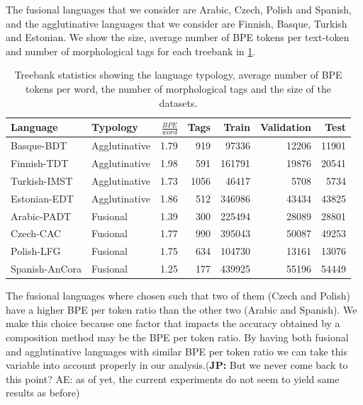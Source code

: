 \documentclass[11pt]{article}
\newcommand\jp[1]{(\textbf{JP:} #1)}
\begin{document}
    
           	The fusional languages that we consider are Arabic, Czech,
     Polish and Spanish, and the agglutinative languages that we
     consider are Finnish, Basque, Turkish and Estonian.  We show the
     size, average number of BPE tokens per text-token and number of
     morphological tags for each treebank in \cref{tab:data}.
    

    
    
    	\begin{table} %
		\centering
		\begin{tabular}{l|lrrrrr}
			Language & Typology & $\frac{BPE}{word}$ & Tags & Train & Validation & Test \\
			\hline
			Basque-BDT      & Agglutinative & 1.79 & 919 & 97336 & 12206 & 11901 \\
			Finnish-TDT     & Agglutinative & 1.98 & 591 & 161791 & 19876 & 20541 \\
			Turkish-IMST    & Agglutinative & 1.73 & 1056 & 46417 & 5708 & 5734 \\
			Estonian-EDT    & Agglutinative & 1.86 & 512 & 346986 & 43434 & 43825 \\
            Arabic-PADT     & Fusional & 1.39 & 300 & 225494 & 28089 & 28801  \\
			Czech-CAC       & Fusional & 1.77 & 990 & 395043 & 50087 & 49253 \\
			Polish-LFG      & Fusional & 1.75 & 634 & 104730 & 13161 & 13076 \\
			Spanish-AnCora  & Fusional & 1.25 & 177 & 439925 & 55196 & 54449 \\
        \end{tabular}
		\caption{\label{tab:data} Treebank statistics showing the language typology, average number of BPE tokens per word, the number of morphological tags and the size of the datasets.}
	\end{table}
    
        The fusional languages where chosen such that two of them
        (Czech and Polish) have a higher BPE per token ratio than the
        other two (Arabic and Spanish). We make this choice because
        one factor that impacts the accuracy obtained by a composition
        method may be the BPE per token ratio.  By having both
        fusional and agglutinative languages with similar BPE per
        token ratio we can take this variable into account properly in
        our analysis.\jp{But we never come back to this point? AE: as of yet, the current experiments do not seem to yield same results as before}
\end{document}
